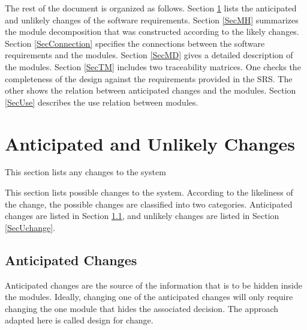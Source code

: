\documentclass[12pt, titlepage]{article}
\begin{document}
The rest of the document is organized as follows. Section
\ref{SecChange} lists the anticipated and unlikely changes of the software
requirements. Section \ref{SecMH} summarizes the module decomposition that
was constructed according to the likely changes. Section \ref{SecConnection}
specifies the connections between the software requirements and the
modules. Section \ref{SecMD} gives a detailed description of the
modules. Section \ref{SecTM} includes two traceability matrices. One checks
the completeness of the design against the requirements provided in the SRS. The
other shows the relation between anticipated changes and the modules. Section
\ref{SecUse} describes the use relation between modules.

\section{Anticipated and Unlikely Changes} \label{SecChange}

This section lists any changes to the system

This section lists possible changes to the system. According to the likeliness
of the change, the possible changes are classified into two
categories. Anticipated changes are listed in Section \ref{SecAchange}, and
unlikely changes are listed in Section \ref{SecUchange}.

\subsection{Anticipated Changes} \label{SecAchange}

Anticipated changes are the source of the information that is to be hidden
inside the modules. Ideally, changing one of the anticipated changes will only
require changing the one module that hides the associated decision. The approach
adapted here is called design for
change.
\end{document}
